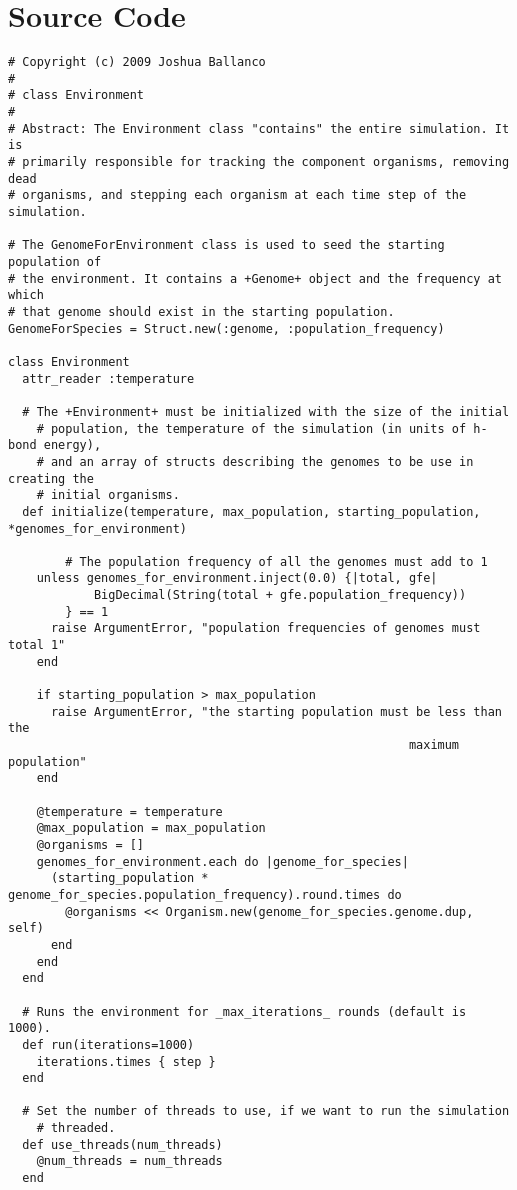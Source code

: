 \appendix
\chapter{Source Code} %
\label{cha:source_code}

\lstset{language=ruby, numbers=left, basicstyle=\scriptsize \tt}
\begin{lstlisting}
# Copyright (c) 2009 Joshua Ballanco
#
# class Environment
#
# Abstract: The Environment class "contains" the entire simulation. It is
# primarily responsible for tracking the component organisms, removing dead
# organisms, and stepping each organism at each time step of the simulation.

# The GenomeForEnvironment class is used to seed the starting population of
# the environment. It contains a +Genome+ object and the frequency at which
# that genome should exist in the starting population.
GenomeForSpecies = Struct.new(:genome, :population_frequency)

class Environment
  attr_reader :temperature

  # The +Environment+ must be initialized with the size of the initial
	# population, the temperature of the simulation (in units of h-bond energy),
	# and an array of structs describing the genomes to be use in creating the
	# initial organisms.
  def initialize(temperature, max_population, starting_population, *genomes_for_environment)
    
		# The population frequency of all the genomes must add to 1
    unless genomes_for_environment.inject(0.0) {|total, gfe|
			BigDecimal(String(total + gfe.population_frequency))
		} == 1
      raise ArgumentError, "population frequencies of genomes must total 1"
    end

    if starting_population > max_population
      raise ArgumentError, "the starting population must be less than the
														maximum population"
    end

    @temperature = temperature
    @max_population = max_population
    @organisms = []
    genomes_for_environment.each do |genome_for_species|
      (starting_population * genome_for_species.population_frequency).round.times do
        @organisms << Organism.new(genome_for_species.genome.dup, self)
      end
    end
  end

  # Runs the environment for _max_iterations_ rounds (default is 1000).
  def run(iterations=1000)
    iterations.times { step }
  end

  # Set the number of threads to use, if we want to run the simulation
	# threaded.
  def use_threads(num_threads)
    @num_threads = num_threads
  end


\end{lstlisting}
